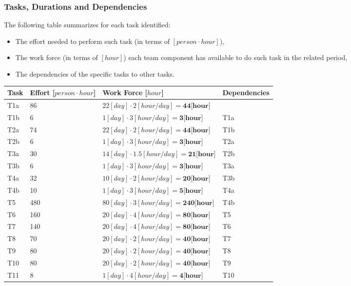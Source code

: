\subsubsection{Tasks, Durations and Dependencies}
The following table summarizes for each task identified:
\begin{itemize}
	\item The effort needed to perform such task (in terms of $[person \cdot hour]$),
	\item The work force (in terms of $[hour]$) each team component has available to do such task in the related period,
	\item The dependencies of the specific tasks to other tasks.
\end{itemize}
\begin{center}
	\begin{tabulary}{\linewidth\tymin=70pt}{Y{1cm}|Y{2.5cm}|Y{4cm}|Y{2.5cm}}
		\textbf{Task} & \textbf{Effort [$person \cdot hour$]} & \textbf{Work Force [$hour$]} & \textbf{Dependencies} \\ \hline
		T1a &  86 & $22[day] \cdot 2[hour/day] = \textbf{44[hour]}$  & \\ \hline
		T1b & 6 & $1[day] \cdot 3[hour/day] = \textbf{3[hour]}$ & T1a \\ \hline
		T2a & 74 & $22[day] \cdot 2[hour/day] = \textbf{44[hour]}$ & T1b \\ \hline
		T2b & 6 & $1[day] \cdot 3[hour/day] = \textbf{3[hour]}$ & T2a \\ \hline
		T3a & 30 & $14[day] \cdot 1.5[hour/day] = \textbf{21[hour]}$ & T2b \\ \hline
		T3b & 6 & $1[day] \cdot 3[hour/day] = \textbf{3[hour]}$ & T3a \\ \hline
		T4a & 32 & $10[day] \cdot 2[hour/day] = \textbf{20[hour]}$ & T3b \\ \hline
		T4b & 10 & $1[day] \cdot 3[hour/day] = \textbf{5[hour]}$ & T4a \\ \hline
		T5 & 480 & $80[day] \cdot 3[hour/day] = \textbf{240[hour]}$ & T4b \\ \hline
		T6 & 160 & $20[day] \cdot 4[hour/day] = \textbf{80[hour]}$ & T5 \\ \hline
		T7 & 140 & $20[day] \cdot 4[hour/day] = \textbf{80[hour]}$ & T6 \\ \hline
		T8 & 70 & $20[day] \cdot 2[hour/day] = \textbf{40[hour]}$ & T7 \\ \hline
		T9 & 80 & $20[day] \cdot 2[hour/day] = \textbf{40[hour]}$ & T8 \\ \hline
		T10 & 80 & $20[day] \cdot 2[hour/day] = \textbf{40[hour]}$ & T9 \\ \hline
		T11 & 8 & $1[day] \cdot 4[hour/day] = \textbf{4[hour]}$ & T10 \\
	\end{tabulary}
\end{center}
